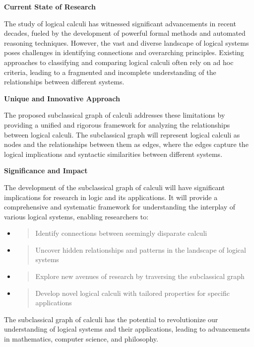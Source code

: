 \textbf{Current State of Research}

The study of logical calculi has witnessed significant advancements in
recent decades, fueled by the development of powerful formal methods and
automated reasoning techniques. However, the vast and diverse landscape
of logical systems poses challenges in identifying connections and
overarching principles. Existing approaches to classifying and comparing
logical calculi often rely on ad hoc criteria, leading to a fragmented
and incomplete understanding of the relationships between different
systems.

\textbf{Unique and Innovative Approach}

The proposed subclassical graph of calculi addresses these limitations
by providing a unified and rigorous framework for analyzing the
relationships between logical calculi. The subclassical graph will
represent logical calculi as nodes and the relationships between them as
edges, where the edges capture the logical implications and syntactic
similarities between different systems.

\textbf{Significance and Impact}

The development of the subclassical graph of calculi will have
significant implications for research in logic and its applications. It
will provide a comprehensive and systematic framework for understanding
the interplay of various logical systems, enabling researchers to:

\begin{itemize}
\item
  \begin{quote}
  Identify connections between seemingly disparate calculi
  \end{quote}
\item
  \begin{quote}
  Uncover hidden relationships and patterns in the landscape of logical
  systems
  \end{quote}
\item
  \begin{quote}
  Explore new avenues of research by traversing the subclassical graph
  \end{quote}
\item
  \begin{quote}
  Develop novel logical calculi with tailored properties for specific
  applications
  \end{quote}
\end{itemize}

The subclassical graph of calculi has the potential to revolutionize our
understanding of logical systems and their applications, leading to
advancements in mathematics, computer science, and philosophy.

